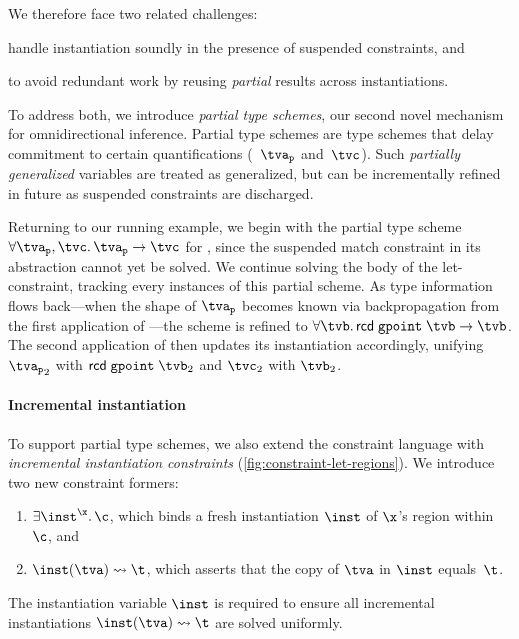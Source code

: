 \documentclass[acmsmall,screen,nonacm%
\Anonymous{,anonymous}{}%
\Final{}{,review}%
]{acmart}
\begin{document}
\begin{local}

We therefore face two related challenges: \begin{enumerate*}
  \item handle instantiation soundly in the presence of suspended constraints, and
  \item to avoid redundant work by reusing \emph{partial} results across instantiations.
\end{enumerate*}

To address both, we introduce \emph{partial type schemes}, our second novel
mechanism for omnidirectional inference. Partial type schemes are type schemes
that delay commitment to certain quantifications (\eg~$\tvp$ and~$\tvgetxret$).
Such \emph{partially generalized} variables are treated as generalized, but can
be incrementally refined in future as suspended constraints are discharged.

Returning to our running example, we begin with the partial type scheme $\all
{\tvp, \tvgetxret} \tvp \to \tvgetxret$ for , since the suspended
match constraint in its abstraction cannot yet be solved. We continue solving
the body of the let-constraint, tracking every instances of this partial
scheme. As type information flows back---\eg when the shape of $\tvp$ becomes
known via backpropagation from the first application of ---the
scheme is refined to $\all {\tvb} \trcd \tgpoint \tvb \to \tvb$. The second
application of  then updates its instantiation accordingly, unifying
$\tvp_2$ with $\trcd \tgpoint \tvb_2$ and $\tvgetxret_2$ with $\tvb_2$.

\end{local}


\paragraph{Incremental instantiation}
\label{sec/solver/incr-inst}


To support partial type schemes, we also extend the constraint language with
\emph{incremental instantiation constraints}
(\cref{fig:constraint-let-regions}).
We introduce two new constraint formers:
%
\begin{enumerate}
  \item
    $\cexistsi \inst \x \c$, which binds a fresh instantiation $\inst$ of $\x$'s
    region within $\c$, and
  \item
    $\cpinst \inst \tv \t$, which asserts that the copy of $\tv$ in $\inst$
    equals~$\t$.
\end{enumerate}
The instantiation variable $\inst$ is required to ensure all incremental
instantiations $\cpinst \inst \tv \t$ are solved uniformly.
\end{document}
